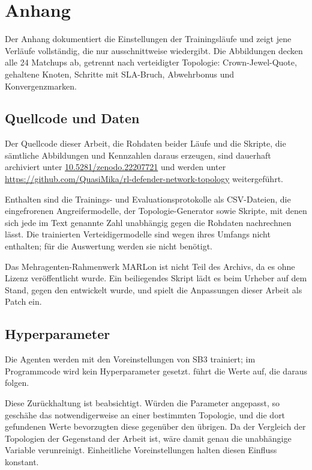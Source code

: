 \chapter{Anhang}
\label{ch:anhang}

Der Anhang dokumentiert die Einstellungen der Trainingsläufe und zeigt
jene Verläufe vollständig, die  nur ausschnittweise
wiedergibt. Die Abbildungen decken alle 24 Matchups ab, getrennt nach
verteidigter Topologie: Crown-Jewel-Quote, gehaltene Knoten, Schritte mit
\ac{SLA}-Bruch, Abwehrbonus und Konvergenzmarken.

\section{Quellcode und Daten}
\label{sec:begleitmaterial}

Der Quellcode dieser Arbeit, die Rohdaten beider Läufe und die Skripte, die
sämtliche Abbildungen und Kennzahlen daraus erzeugen, sind dauerhaft archiviert
unter \href{https://doi.org/10.5281/zenodo.22207721}{10.5281/zenodo.22207721}
und werden unter
\url{https://github.com/QuasiMika/rl-defender-network-topology} weitergeführt.

Enthalten sind die Trainings- und Evaluationsprotokolle als CSV-Dateien, die
eingefrorenen Angreifermodelle, der Topologie-Generator sowie Skripte, mit
denen sich jede im Text genannte Zahl unabhängig gegen die Rohdaten nachrechnen
lässt. Die trainierten Verteidigermodelle sind wegen ihres Umfangs nicht
enthalten; für die Auswertung werden sie nicht benötigt.

Das Mehragenten-Rahmenwerk MARLon ist nicht Teil des Archivs, da es ohne
Lizenz veröffentlicht wurde. Ein beiliegendes Skript lädt es beim Urheber auf
dem Stand, gegen den entwickelt wurde, und spielt die Anpassungen dieser Arbeit
als Patch ein.

\section{Hyperparameter}
\label{sec:hyperparameter}

Die Agenten werden mit den Voreinstellungen von \ac{SB3} trainiert; im
Programmcode wird kein Hyperparameter gesetzt.  führt
die Werte auf, die daraus folgen.

Diese Zurückhaltung ist beabsichtigt. Würden die Parameter angepasst, so
geschähe das notwendigerweise an einer bestimmten Topologie, und die dort
gefundenen Werte bevorzugten diese gegenüber den übrigen. Da der Vergleich der
Topologien der Gegenstand der Arbeit ist, wäre damit genau die unabhängige
Variable verunreinigt. Einheitliche Voreinstellungen halten diesen Einfluss
konstant.

